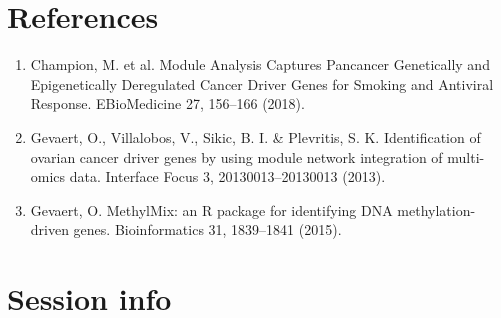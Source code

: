 \documentclass[8pt,a4,]{article}
\providecommand{\tightlist}{%
  \setlength{\itemsep}{0pt}\setlength{\parskip}{0pt}}
\begin{document}
\section{References}\label{references}

\begin{enumerate}
\def\labelenumi{\arabic{enumi}.}
\tightlist
\item
  Champion, M. et al. Module Analysis Captures Pancancer Genetically and
  Epigenetically Deregulated Cancer Driver Genes for Smoking and
  Antiviral Response. EBioMedicine 27, 156--166 (2018).
\item
  Gevaert, O., Villalobos, V., Sikic, B. I. \& Plevritis, S. K.
  Identification of ovarian cancer driver genes by using module network
  integration of multi-omics data. Interface Focus 3, 20130013--20130013
  (2013).
\item
  Gevaert, O. MethylMix: an R package for identifying DNA
  methylation-driven genes. Bioinformatics 31, 1839--1841 (2015).
\end{enumerate}

\newpage

\section*{Session info}\label{session-info}
\end{document}
